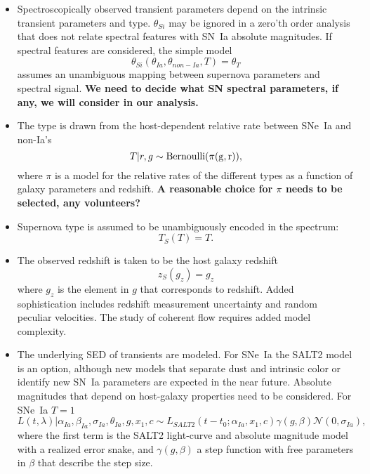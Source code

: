 \documentclass[preprint,3p]{elsarticle}
\begin{document}
\begin{itemize}
\item Spectroscopically observed transient parameters depend on the intrinsic transient
parameters and type.  $\theta_{Si}$ may be ignored in a zero'th order analysis that
does not relate spectral features with SN~Ia absolute magnitudes.   If spectral
features are considered, the simple model
\begin{equation}
\theta_{Si} (\theta_{Ia}, \theta_{non-Ia}, T)=\theta_T
\end{equation}
assumes an unambiguous mapping between supernova parameters and spectral signal.
{\bf We need to decide what SN spectral parameters, if any, we will consider in our analysis.}
\item The type is drawn from the host-dependent relative rate between SNe~Ia and non-Ia's 
\begin{equation}
T | r, g \sim \rm{Bernoulli}(\pi(g,r)),
\end{equation}
where $\pi$ is a model for the relative rates of the different types as a
function of galaxy parameters and redshift.  {\bf A reasonable choice for $\pi$ needs to be
selected, any volunteers?}
\item Supernova type is assumed to be unambiguously encoded in the
spectrum:
\begin{equation}
T_S (T)  = T.
\end{equation}
\item The observed redshift is taken to be the host galaxy redshift
\begin{equation}
z_S (g_z) =g_z
\end{equation}
where $g_z$ is the element in $g$ that corresponds to redshift.
Added sophistication includes redshift
measurement uncertainty and random peculiar velocities. The study of coherent
flow requires added model complexity.
\item The underlying SED of transients are modeled.  For SNe~Ia the SALT2 model
is an option, although new models that separate dust and intrinsic color or
identify new SN~Ia parameters are expected in the near future.  Absolute magnitudes
that depend on host-galaxy properties need to be considered. 
For SNe~Ia $T=1$
\begin{equation}
L(t,\lambda) |  \alpha_{Ia}, \beta_{Ia}, \sigma_{Ia},  \theta_{Ia}, g, x_1, c \sim L_{SALT2}(t-t_0; \alpha_{Ia}, x_1, c) \gamma(g, \beta) \mathcal{N}(0,\sigma_{Ia}),
\end{equation}
where the first  term is the SALT2 light-curve and absolute magnitude
model with a realized error snake,
and $\gamma(g, \beta)$ a step function with free parameters in $\beta$ that
describe the step size.


\end{itemize}
\end{document}
